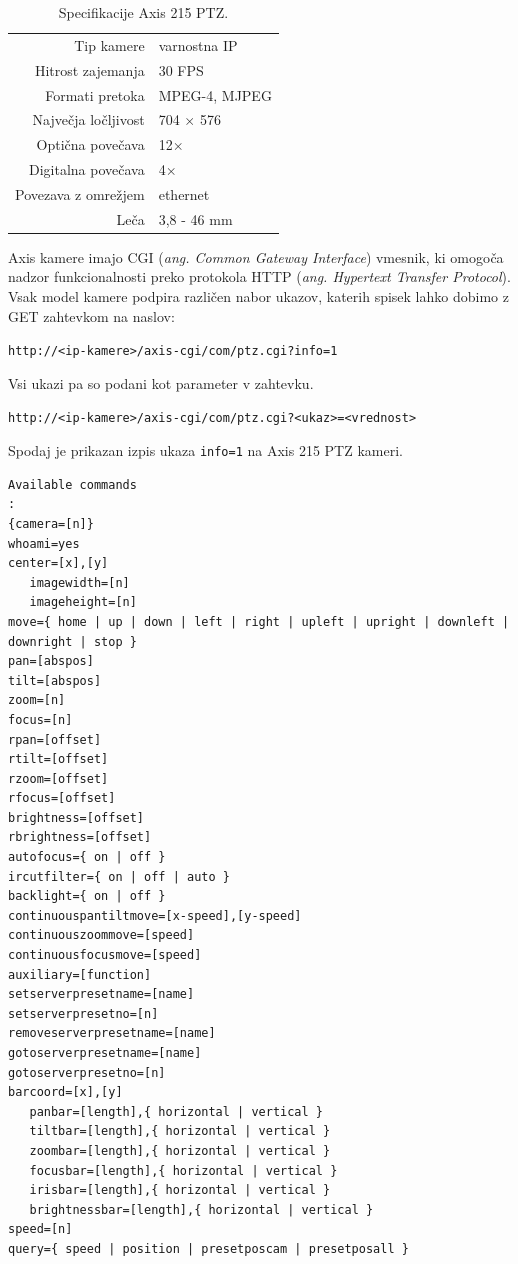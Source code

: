 \documentclass[a4paper, 12pt]{book}
\begin{document}
\begin{table}[H]
\centering
\begin{tabular}{| r | l |}
\hline
Tip kamere & varnostna IP \\
Hitrost zajemanja & 30 FPS \\
Formati pretoka & MPEG-4, MJPEG \\
Največja ločljivost & 704 $\times$ 576 \\
Optična povečava & 12$\times$ \\
Digitalna povečava & 4$\times$ \\
Povezava z omrežjem & ethernet \\
Leča & 3,8 - 46 mm \\
\hline
\end{tabular}
\caption{Specifikacije Axis 215 PTZ.}
\end{table}

Axis kamere imajo CGI (\emph{ang. Common Gateway Interface}) vmesnik, ki omogoča nadzor funkcionalnosti preko protokola HTTP (\emph{ang. Hypertext Transfer Protocol}). Vsak model kamere podpira različen nabor ukazov, katerih spisek lahko dobimo z GET zahtevkom na naslov:
\begin{center}
\texttt{http://<ip-kamere>/axis-cgi/com/ptz.cgi?info=1}
\end{center}
Vsi ukazi pa so podani kot parameter v zahtevku.
\begin{center}
\texttt{http://<ip-kamere>/axis-cgi/com/ptz.cgi?<ukaz>=<vrednost>}
\end{center}
Spodaj je prikazan izpis ukaza \texttt{info=1} na Axis 215 PTZ kameri.
\begin{lstlisting}
Available commands
:
{camera=[n]}
whoami=yes
center=[x],[y]
   imagewidth=[n]
   imageheight=[n]
move={ home | up | down | left | right | upleft | upright | downleft | downright | stop }
pan=[abspos]
tilt=[abspos]
zoom=[n]
focus=[n]
rpan=[offset]
rtilt=[offset]
rzoom=[offset]
rfocus=[offset]
brightness=[offset]
rbrightness=[offset]
autofocus={ on | off }
ircutfilter={ on | off | auto }
backlight={ on | off }
continuouspantiltmove=[x-speed],[y-speed]
continuouszoommove=[speed]
continuousfocusmove=[speed]
auxiliary=[function]
setserverpresetname=[name]
setserverpresetno=[n]
removeserverpresetname=[name]
gotoserverpresetname=[name]
gotoserverpresetno=[n]
barcoord=[x],[y]
   panbar=[length],{ horizontal | vertical }
   tiltbar=[length],{ horizontal | vertical }
   zoombar=[length],{ horizontal | vertical }
   focusbar=[length],{ horizontal | vertical }
   irisbar=[length],{ horizontal | vertical }
   brightnessbar=[length],{ horizontal | vertical }
speed=[n]
query={ speed | position | presetposcam | presetposall }
\end{lstlisting}
\end{document}
